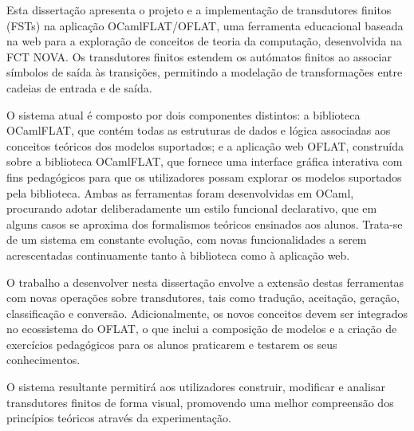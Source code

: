 
%

Esta dissertação apresenta o projeto e a implementação de transdutores finitos (FSTs) na aplicação OCamlFLAT/OFLAT, 
uma ferramenta educacional baseada na web para a exploração de conceitos de teoria da computação, 
desenvolvida na FCT NOVA. Os transdutores finitos estendem os autómatos finitos ao associar símbolos de saída às transições, 
permitindo a modelação de transformações entre cadeias de entrada e de saída.

O sistema atual é composto por dois componentes distintos: a biblioteca OCamlFLAT, 
que contém todas as estruturas de dados e lógica associadas aos conceitos teóricos dos modelos suportados; 
e a aplicação web OFLAT, construída sobre a biblioteca OCamlFLAT, que fornece uma interface gráfica interativa com fins pedagógicos 
para que os utilizadores possam explorar os modelos suportados pela biblioteca. Ambas as ferramentas foram desenvolvidas em OCaml, 
procurando adotar deliberadamente um estilo funcional declarativo, que em alguns casos se aproxima dos formalismos teóricos ensinados aos alunos. 
Trata-se de um sistema em constante evolução, com novas funcionalidades a serem acrescentadas continuamente tanto à biblioteca como à aplicação web.

O trabalho a desenvolver nesta dissertação envolve a extensão destas ferramentas com novas operações sobre transdutores, 
tais como tradução, aceitação, geração, classificação e conversão. 
Adicionalmente, os novos conceitos devem ser integrados no ecossistema do OFLAT, 
o que inclui a composição de modelos e a criação de exercícios pedagógicos para os alunos praticarem e testarem os seus conhecimentos.

O sistema resultante permitirá aos utilizadores construir, modificar e analisar transdutores finitos de forma visual, 
promovendo uma melhor compreensão dos princípios teóricos através da experimentação.
